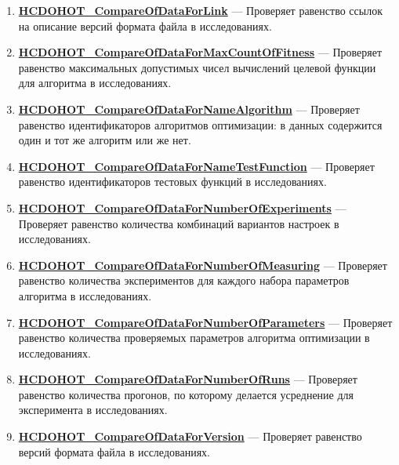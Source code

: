 \documentclass[a4paper,12pt]{article}
\begin{document}
\begin{enumerate}
\item \textbf{\hyperref[HCDOHOT_CompareOfDataForLink]{HCDOHOT\_CompareOfDataForLink}} --- Проверяет равенство ссылок на описание версий формата файла в исследованиях.

\item \textbf{\hyperref[HCDOHOT_CompareOfDataForMaxCountOfFitness]{HCDOHOT\_CompareOfDataForMaxCountOfFitness}} --- Проверяет равенство максимальных допустимых чисел вычислений целевой функции для алгоритма в исследованиях.

\item \textbf{\hyperref[HCDOHOT_CompareOfDataForNameAlgorithm]{HCDOHOT\_CompareOfDataForNameAlgorithm}} --- Проверяет равенство идентификаторов алгоритмов оптимизации: в данных содержится один и тот же алгоритм или же нет.

\item \textbf{\hyperref[HCDOHOT_CompareOfDataForNameTestFunction]{HCDOHOT\_CompareOfDataForNameTestFunction}} --- Проверяет равенство идентификаторов тестовых функций в исследованиях.

\item \textbf{\hyperref[HCDOHOT_CompareOfDataForNumberOfExperiments]{HCDOHOT\_CompareOfDataForNumberOfExperiments}} --- Проверяет равенство количества комбинаций вариантов настроек в исследованиях.

\item \textbf{\hyperref[HCDOHOT_CompareOfDataForNumberOfMeasuring]{HCDOHOT\_CompareOfDataForNumberOfMeasuring}} --- Проверяет равенство количества экспериментов для каждого набора параметров алгоритма в исследованиях.

\item \textbf{\hyperref[HCDOHOT_CompareOfDataForNumberOfParameters]{HCDOHOT\_CompareOfDataForNumberOfParameters}} --- Проверяет равенство количества проверяемых параметров алгоритма оптимизации в исследованиях.

\item \textbf{\hyperref[HCDOHOT_CompareOfDataForNumberOfRuns]{HCDOHOT\_CompareOfDataForNumberOfRuns}} --- Проверяет равенство количества прогонов, по которому делается усреднение для эксперимента в исследованиях.

\item \textbf{\hyperref[HCDOHOT_CompareOfDataForVersion]{HCDOHOT\_CompareOfDataForVersion}} --- Проверяет равенство версий формата файла в исследованиях.

\end{enumerate}
\end{document}
